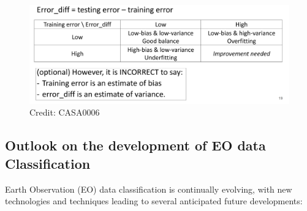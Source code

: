 \documentclass[
  letterpaper,
  DIV=11,
  numbers=noendperiod]{scrreprt}
\begin{document}
\begin{figure}

{\centering \includegraphics{./images/Bias-variance-02.png}

}

\caption{\label{fig-BiasVar02}Credit: CASA0006}

\end{figure}

\hypertarget{outlook-on-the-development-of-eo-data-classification}{%
\subsection{Outlook on the development of EO data
Classification}\label{outlook-on-the-development-of-eo-data-classification}}

Earth Observation (EO) data classification is continually evolving, with
new technologies and techniques leading to several anticipated future
developments:
\end{document}
